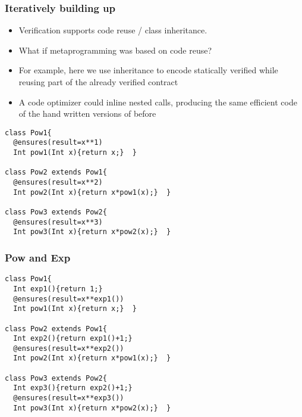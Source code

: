 \begin{frame}[fragile]
\frametitle{Iteratively building up \Q@pow@}
\vspace{-2ex}
\begin{itemize}
\item Verification supports code reuse / class inheritance.
\item What if metaprogramming was based on code reuse?
\item For example, here we use inheritance to encode statically verified
\Q@pow@s while reusing part of the already verified contract
\item \tiny{A code optimizer could inline nested calls, producing 
the same efficient code of the hand written versions of before}
\end{itemize}
\vspace{-1ex}
\begin{lstlisting}
class Pow1{
  @ensures(result=x**1)
  Int pow1(Int x){return x;}  }

class Pow2 extends Pow1{
  @ensures(result=x**2)
  Int pow2(Int x){return x*pow1(x);}  }

class Pow3 extends Pow2{
  @ensures(result=x**3)
  Int pow3(Int x){return x*pow2(x);}  }
\end{lstlisting}
\end{frame}



\begin{frame}[fragile]
\frametitle{Pow and Exp}
\vspace{-4ex}
\begin{lstlisting}
class Pow1{
  Int exp1(){return 1;}
  @ensures(result=x**exp1())
  Int pow1(Int x){return x;}  }

class Pow2 extends Pow1{
  Int exp2(){return exp1()+1;}
  @ensures(result=x**exp2())
  Int pow2(Int x){return x*pow1(x);}  }

class Pow3 extends Pow2{
  Int exp3(){return exp2()+1;}
  @ensures(result=x**exp3())
  Int pow3(Int x){return x*pow2(x);}  }
\end{lstlisting}
\end{frame}


